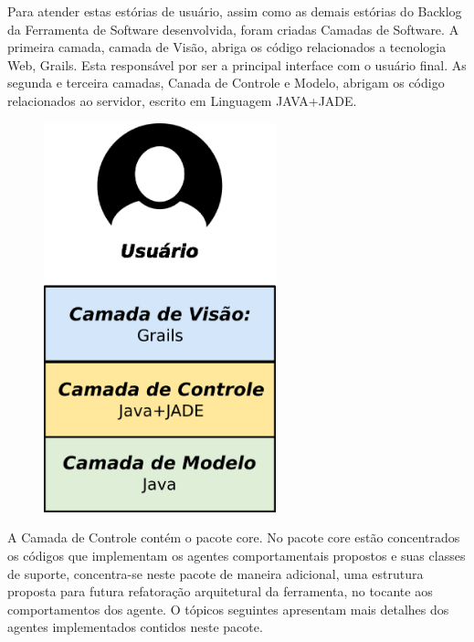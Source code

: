 \begin{apendicesenv}
Para atender estas estórias de usuário, assim como as demais estórias do Backlog da Ferramenta de Software desenvolvida, foram criadas Camadas de Software. A primeira camada, camada de Visão, abriga os código relacionados a tecnologia Web, Grails. Esta responsável por ser a principal interface com o usuário final. As segunda  e terceira camadas, Canada de Controle e Modelo, abrigam os código relacionados ao servidor, escrito em Linguagem JAVA+JADE. 

\begin{figure}[h]
\centering
\label{f1}
\includegraphics[width=0.6\textwidth]{figuras/arquiteturaVisaoGeral}
\end{figure}

A Camada de Controle contém o pacote core. No pacote core estão concentrados os códigos que implementam os agentes comportamentais propostos e suas classes de suporte, concentra-se neste pacote de maneira adicional, uma estrutura proposta para futura refatoração arquitetural da ferramenta, no tocante aos comportamentos dos agente. O tópicos seguintes apresentam mais detalhes dos agentes implementados contidos neste pacote.


\end{apendicesenv}
